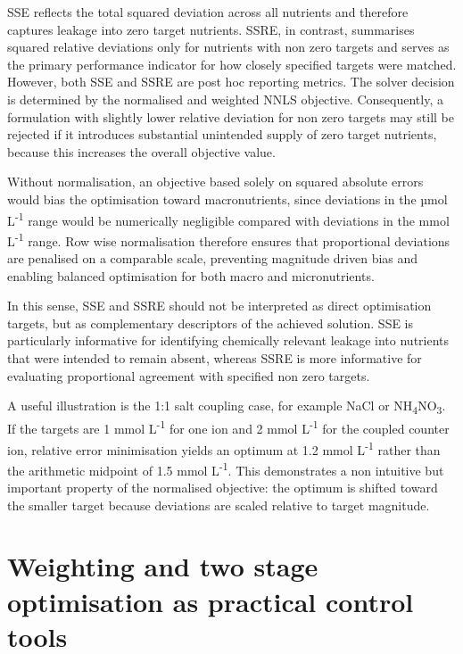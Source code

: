 \documentclass[
  letterpaper,
  DIV=11,
  numbers=noendperiod]{scrreprt}
\begin{document}
SSE reflects the total squared deviation across all nutrients and
therefore captures leakage into zero target nutrients. SSRE, in
contrast, summarises squared relative deviations only for nutrients with
non zero targets and serves as the primary performance indicator for how
closely specified targets were matched. However, both SSE and SSRE are
post hoc reporting metrics. The solver decision is determined by the
normalised and weighted NNLS objective. Consequently, a formulation with
slightly lower relative deviation for non zero targets may still be
rejected if it introduces substantial unintended supply of zero target
nutrients, because this increases the overall objective value.

Without normalisation, an objective based solely on squared absolute
errors would bias the optimisation toward macronutrients, since
deviations in the µmol L\textsuperscript{-1} range would be numerically
negligible compared with deviations in the mmol L\textsuperscript{-1}
range. Row wise normalisation therefore ensures that proportional
deviations are penalised on a comparable scale, preventing magnitude
driven bias and enabling balanced optimisation for both macro and
micronutrients.

In this sense, SSE and SSRE should not be interpreted as direct
optimisation targets, but as complementary descriptors of the achieved
solution. SSE is particularly informative for identifying chemically
relevant leakage into nutrients that were intended to remain absent,
whereas SSRE is more informative for evaluating proportional agreement
with specified non zero targets.

A useful illustration is the 1:1 salt coupling case, for example NaCl or
NH\textsubscript{4}NO\textsubscript{3}. If the targets are 1 mmol
L\textsuperscript{-1} for one ion and 2 mmol L\textsuperscript{-1} for
the coupled counter ion, relative error minimisation yields an optimum
at 1.2 mmol L\textsuperscript{-1} rather than the arithmetic midpoint of
1.5 mmol L\textsuperscript{-1}. This demonstrates a non intuitive but
important property of the normalised objective: the optimum is shifted
toward the smaller target because deviations are scaled relative to
target magnitude.

\section{Weighting and two stage optimisation as practical control
tools}\label{weighting-and-two-stage-optimisation-as-practical-control-tools}
\end{document}
